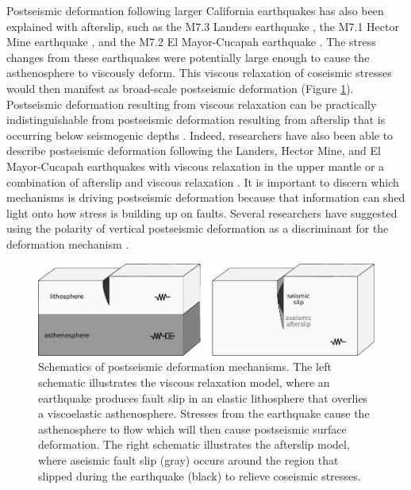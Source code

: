 Postseismic deformation following larger California earthquakes has
also been explained with afterslip, such as the M7.3 Landers
earthquake \citep{Shen1994, Savage1997}, the M7.1 Hector Mine
earthquake \citep{Jacobs2002, Owen2002}, and the M7.2 El Mayor-Cucapah
earthquake \citep{Gonzalez-ortega2014}. The stress changes from these
earthquakes were potentially large enough to cause the asthenosphere
to viscously deform. This viscous relaxation of coseismic stresses
would then manifest as broad-scale postseismic deformation
\citep{Nur1974} (Figure \ref{intro:fig:1}). Postseismic deformation
resulting from viscous relaxation can be practically indistinguishable
from postseismic deformation resulting from afterslip that is occurring
below seismogenic depths \citep{Savage1990}. Indeed, researchers have
also been able to describe postseismic deformation following the
Landers, Hector Mine, and El Mayor-Cucapah earthquakes with viscous
relaxation in the upper mantle \citep{Pollitz2000, Pollitz2001,
Freed2004, Freed2007a, Spinler2015} or a combination of afterslip and
viscous relaxation \citep{Pollitz2012, Pollitz2015, Rollins2015}. It
is important to discern which mechanisms is driving postseismic
deformation because that information can shed light onto how stress is
building up on faults. Several researchers have suggested using the
polarity of vertical postseismic deformation as a discriminant for the
deformation mechanism \citep[e.g.,][]{Pollitz2003, Hetland2014,
Rollins2015}.

\begin{figure} \includegraphics{schematic} 
\caption[Schematics of postseismic deformation mechanisms] 
{Schematics of postseismic deformation mechanisms. The left schematic
illustrates the viscous relaxation model, where an earthquake produces
fault slip in an elastic lithosphere that overlies a viscoelastic
asthenosphere. Stresses from the earthquake cause the asthenosphere to
flow which will then cause postseismic surface deformation. The right
schematic illustrates the afterslip model, where aseismic fault slip
(gray) occurs around the region that slipped during the earthquake
(black) to relieve coseismic stresses.}
\label{intro:fig:1}
\end{figure}

